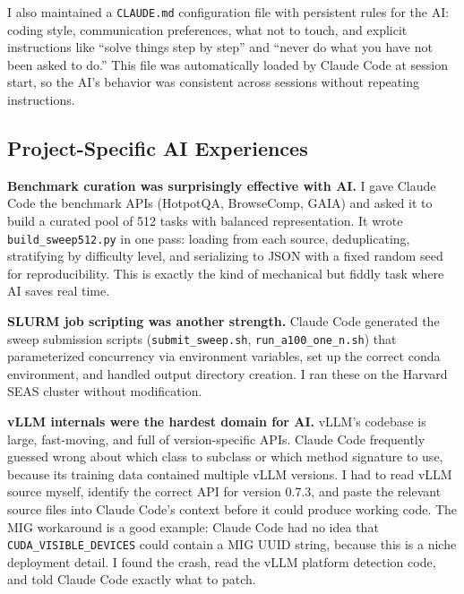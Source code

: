 \documentclass[10pt,twocolumn]{article}
\begin{document}
I also maintained a \texttt{CLAUDE.md} configuration file with persistent rules for the AI: coding style, communication preferences, what not to touch, and explicit instructions like ``solve things step by step'' and ``never do what you have not been asked to do.'' This file was automatically loaded by Claude Code at session start, so the AI's behavior was consistent across sessions without repeating instructions.

\subsection{Project-Specific AI Experiences}

\textbf{Benchmark curation was surprisingly effective with AI.} I gave Claude Code the benchmark APIs (HotpotQA, BrowseComp, GAIA) and asked it to build a curated pool of 512 tasks with balanced representation. It wrote \texttt{build\_sweep512.py} in one pass: loading from each source, deduplicating, stratifying by difficulty level, and serializing to JSON with a fixed random seed for reproducibility. This is exactly the kind of mechanical but fiddly task where AI saves real time.

\textbf{SLURM job scripting was another strength.} Claude Code generated the sweep submission scripts (\texttt{submit\_sweep.sh}, \texttt{run\_a100\_one\_n.sh}) that parameterized concurrency via environment variables, set up the correct conda environment, and handled output directory creation. I ran these on the Harvard SEAS cluster without modification.

\textbf{vLLM internals were the hardest domain for AI.} vLLM's codebase is large, fast-moving, and full of version-specific APIs. Claude Code frequently guessed wrong about which class to subclass or which method signature to use, because its training data contained multiple vLLM versions. I had to read vLLM source myself, identify the correct API for version 0.7.3, and paste the relevant source files into Claude Code's context before it could produce working code. The MIG workaround is a good example: Claude Code had no idea that \texttt{CUDA\_VISIBLE\_DEVICES} could contain a MIG UUID string, because this is a niche deployment detail. I found the crash, read the vLLM platform detection code, and told Claude Code exactly what to patch.
\end{document}
